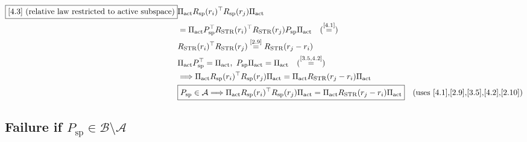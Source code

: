 \documentclass[11pt]{article}
\newcommand{\eqref}[1]{\overset{[#1]}{=}}
\begin{document}
\begin{align}
\boxed{[4.3] \text{ (relative law restricted to active subspace)}}
&\Pi_{\mathrm{act}}
R_{\mathrm{sp}}(r_i)^\top
R_{\mathrm{sp}}(r_j)
\Pi_{\mathrm{act}} \notag\\
&=
\Pi_{\mathrm{act}}
P_{\mathrm{sp}}^\top
R_{\mathrm{STR}}(r_i)^\top
R_{\mathrm{STR}}(r_j)
P_{\mathrm{sp}}
\Pi_{\mathrm{act}}
\quad
(\eqref{4.1}) \notag\\
&R_{\mathrm{STR}}(r_i)^\top
R_{\mathrm{STR}}(r_j)
\eqref{2.9}
R_{\mathrm{STR}}(r_j-r_i) \notag\\
&\Pi_{\mathrm{act}}
P_{\mathrm{sp}}^\top
=
\Pi_{\mathrm{act}},\
P_{\mathrm{sp}}
\Pi_{\mathrm{act}}
=
\Pi_{\mathrm{act}}
\quad(\eqref{3.5,4.2}) \notag\\
&\Longrightarrow
\Pi_{\mathrm{act}}
R_{\mathrm{sp}}(r_i)^\top
R_{\mathrm{sp}}(r_j)
\Pi_{\mathrm{act}}
=
\Pi_{\mathrm{act}}
R_{\mathrm{STR}}(r_j-r_i)
\Pi_{\mathrm{act}} \notag\\
&\boxed{
P_{\mathrm{sp}}\in\mathcal{A}
\Longrightarrow
\Pi_{\mathrm{act}}
R_{\mathrm{sp}}(r_i)^\top
R_{\mathrm{sp}}(r_j)
\Pi_{\mathrm{act}}
=
\Pi_{\mathrm{act}}
R_{\mathrm{STR}}(r_j-r_i)
\Pi_{\mathrm{act}}
}
\quad(\text{uses [4.1],[2.9],[3.5],[4.2],[2.10]})
\end{align}

\subsection{Failure if $P_{\mathrm{sp}}\in\mathcal{B}\setminus\mathcal{A}$}
\end{document}
